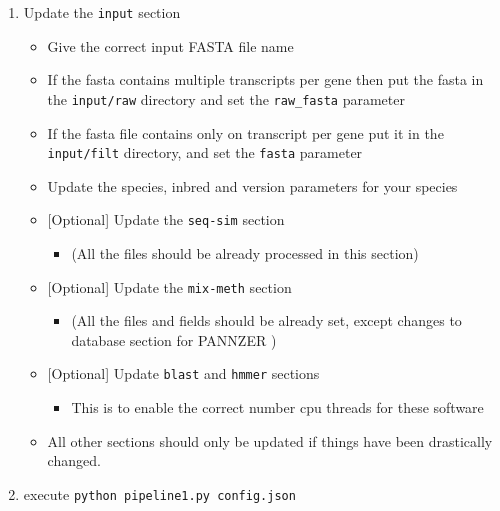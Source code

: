 \begin{enumerate}
\begin{enumerate}
    \end{enumerate}
    
 \item Update the \texttt{input} section

   \begin{itemize}

        \item
              Give the correct input FASTA file name
        \item
              If the fasta contains multiple transcripts per gene then put the
              fasta in the \texttt{input/raw} directory and set the
              \texttt{raw\_fasta} parameter
        \item
              If the fasta file contains only on transcript per gene put it in the
              \texttt{input/filt} directory, and set the \texttt{fasta} parameter
        \item
              Update the species, inbred and version parameters for your species
 \item
       {[}Optional{]} Update the \texttt{seq-sim} section

       \begin{itemize}

        \item
              (All the files should be already processed in this section)
       \end{itemize}
 \item
       {[}Optional{]} Update the \texttt{mix-meth} section

       \begin{itemize}

        \item
              (All the files and fields should be already set, except changes to
              database section for PANNZER )
       \end{itemize}
 \item
       {[}Optional{]} Update \texttt{blast} and \texttt{hmmer} sections

       \begin{itemize}

        \item
              This is to enable the correct number cpu threads for these software
       \end{itemize}
 \item
       All other sections should only be updated if things have been
       drastically changed.
\end{itemize}

 \item
       execute \texttt{python\ pipeline1.py\ config.json}
\end{enumerate}

